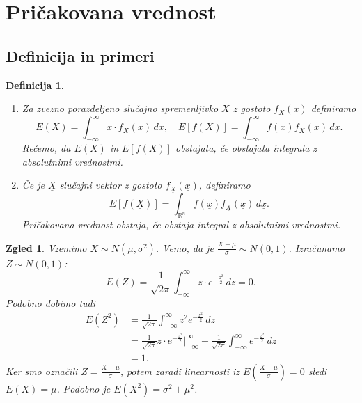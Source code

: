\documentclass[10pt, a4paper]{article}
\newtheorem{defi}[izr]{Definicija}
\newenvironment{noticeB}{%
  \tcolorbox[%
  notitle,
  empty,
  enhanced,  %
  breakable,
  coltext=black,
  colback=white, 
  fontupper=\rmfamily,
  parbox=false,
  noparskip,
  sharp corners,
  boxrule=-1pt,  %
  frame hidden,
  left=7pt,  %
  right=7pt,
  top=5pt,
  bottom=5pt,
  before skip=2.5ex plus 2pt,
  after skip=2.5ex plus 2pt,
  borderline west = {1.5pt}{-0.1pt}{blue!30!black}, %
  overlay unbroken and last={%
    \draw[color=black, line width=1.25pt]
    ($(frame.south west)+(1.pt, -0.1pt)$) -- ++(2em, 0);
  }
  ]}
{\endtcolorbox}
\newenvironment{definicija}{\begin{defi}\begin{noticeB}}{%
    \end{noticeB}\end{defi}}
\newtheorem{zgled}[izr]{Zgled}
\newcommand{\R}{\mathbb {R}}
\begin{document}
  \section{Pričakovana vrednost}

\subsection{Definicija in primeri}

\begin{definicija}
  \begin{enumerate}
    \item Za zvezno porazdeljeno slučajno spremenljivko $X$ z gostoto $f_X (x)$ definiramo 
      $$E(X) = \int_{-\infty} ^\infty x \cdot f_X (x)\, dx,\quad E[f(X)] = \int_{-\infty} ^\infty f(x) f_X(x)\, dx.$$
      Rečemo, da $E(X)$ in $E[f(X)]$ obstajata, če obstajata integrala z absolutnimi vrednostmi.
    \item Če je $\underline{X}$ slučajni vektor z gostoto $f_{\underline{X}} (\underline{x})$, definiramo 
    $$E[f(\underline{X})] = \int_{\R^n} {f(\underline{x})} f_{\underline{X}} (\underline{x})\, d\underline{x}.$$
    Pričakovana vrednost obstaja, če obstaja integral z absolutnimi vrednostmi.
  \end{enumerate}
\end{definicija}

\begin{zgled}
  Vzemimo $X \sim N(\mu, \sigma^2)$. Vemo, da je $\frac{X - \mu}{\sigma} \sim N(0, 1)$.
  Izračunamo $Z \sim N(0, 1)$:
  \begin{equation*}
    E(Z) = \frac{1}{\sqrt{2 \pi}} \int_{-\infty} ^\infty z \cdot e^{-\frac{z^2}{2}}\, dz = 0.
  \end{equation*}
  Podobno dobimo tudi 
  \begin{align*}
    E(Z^2) &= \frac{1}{\sqrt{2 \pi}} \int_{-\infty} ^\infty z^2 e^{-\frac{z^2}{2}}\, dz\\
    &= \frac{1}{\sqrt{2 \pi}} z \cdot e^{-\frac{z^2}{2}} \big|_{-\infty} ^\infty + \frac{1}{\sqrt{2 \pi}}\int_{-\infty} ^\infty e^{-\frac{z^2}{2}}\, dz\\
    &= 1.
  \end{align*}
  Ker smo označili $Z = \frac{X - \mu}{\sigma}$, potem zaradi linearnosti iz $E\left(\frac{X - \mu}{\sigma}\right) = 0$
  sledi $E(X) = \mu$. Podobno je $E(X^2) = \sigma^2 + \mu^2$.
\end{zgled}
\end{document}

